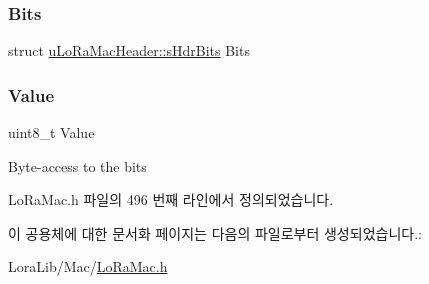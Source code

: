 \subsubsection{\texorpdfstring{Bits}{Bits}}
{\footnotesize\ttfamily struct \mbox{\hyperlink{structu_lo_ra_mac_header_1_1s_hdr_bits}{u\+Lo\+Ra\+Mac\+Header\+::s\+Hdr\+Bits}} Bits}

\mbox{\label{unionu_lo_ra_mac_header_a88f4d00bdab99ae6f48c7ae0bc468bb4}} 
\subsubsection{\texorpdfstring{Value}{Value}}
{\footnotesize\ttfamily uint8\+\_\+t Value}

Byte-\/access to the bits 

Lo\+Ra\+Mac.\+h 파일의 496 번째 라인에서 정의되었습니다.



이 공용체에 대한 문서화 페이지는 다음의 파일로부터 생성되었습니다.\+:\begin{DoxyCompactItemize}
\item 
Lora\+Lib/\+Mac/\mbox{\hyperlink{_lo_ra_mac_8h}{Lo\+Ra\+Mac.\+h}}\end{DoxyCompactItemize}
